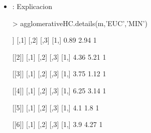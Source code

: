 \documentclass[a4paper, 12pt]{article}
\begin{document}
\begin{itemize}
\begin{Schunk}
\end{Schunk}
		\item \texttt{}: 
		Explicacion
\begin{Schunk}
\begin{Sinput}
> agglomerativeHC.details(m,'EUC','MIN')
\end{Sinput}
\begin{Soutput}
[[1]]
     [,1] [,2] [,3]
[1,] 0.89 2.94    1

[[2]]
     [,1] [,2] [,3]
[1,] 4.36 5.21    1

[[3]]
     [,1] [,2] [,3]
[1,] 3.75 1.12    1

[[4]]
     [,1] [,2] [,3]
[1,] 6.25 3.14    1

[[5]]
     [,1] [,2] [,3]
[1,]  4.1  1.8    1

[[6]]
     [,1] [,2] [,3]
[1,]  3.9 4.27    1


\end{Soutput}
\end{Schunk}
\end{itemize}
\end{document}
